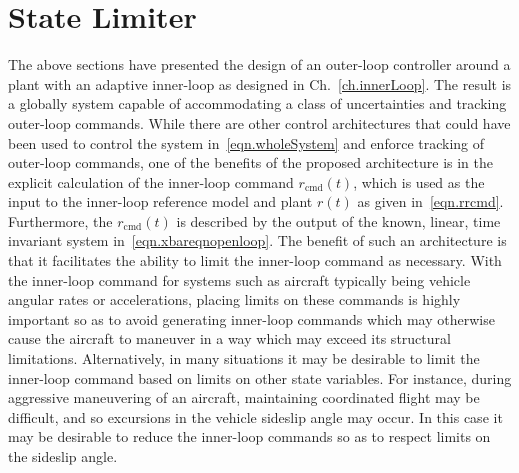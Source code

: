 \section{State Limiter}\label{sec.outerLoop.stateLimiting}

The above sections have presented the design of an outer-loop controller around a plant with an adaptive inner-loop as designed in Ch.~\ref{ch.innerLoop}.
The result is a globally system capable of accommodating a class of uncertainties and tracking outer-loop commands.
While there are other control architectures that could have been used to control the system in\ \eqref{eqn.wholeSystem} and enforce tracking of outer-loop commands, one of the benefits of the proposed architecture is in the explicit calculation of the inner-loop command $r_{\text{cmd}}(t)$, which is used as the input to the inner-loop reference model and plant $r(t)$ as given in\ \eqref{eqn.rrcmd}.
Furthermore, the $r_{\text{cmd}}(t)$ is described by the output of the known, linear, time invariant system in\ \eqref{eqn.xbareqnopenloop}.
The benefit of such an architecture is that it facilitates the ability to limit the inner-loop command as necessary.
With the inner-loop command for systems such as aircraft typically being vehicle angular rates or accelerations, placing limits on these commands is highly important so as to avoid generating inner-loop commands which may otherwise cause the aircraft to maneuver in a way which may exceed its structural limitations.
Alternatively, in many situations it may be desirable to limit the inner-loop command based on limits on other state variables.
For instance, during aggressive maneuvering of an aircraft, maintaining coordinated flight may be difficult, and so excursions in the vehicle sideslip angle may occur.
In this case it may be desirable to reduce the inner-loop commands so as to respect limits on the sideslip angle.

